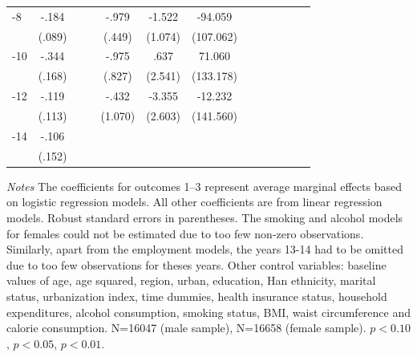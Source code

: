 \begin{table}[p]
\begin{adjustbox}{max width=\linewidth}
\begin{threeparttable}
{\begin{tabular}{l*{6}{S
S}}
-8             &    -.184\sym{**} &         &         &    -.979\sym{**} &   -1.522         &  -94.059         \\
                &   (.089)         &         &         &   (.449)         &  (1.074)         &(107.062)         \\
-10            &    -.344\sym{**} &         &         &    -.975         &     .637         &   71.060         \\
                &   (.168)         &         &         &   (.827)         &  (2.541)         &(133.178)         \\
-12           &    -.119         &         &         &    -.432         &   -3.355         &  -12.232         \\
                &   (.113)         &         &         &  (1.070)         &  (2.603)         &(141.560)         \\
-14           &    -.106         &         &         &                  &                  &                  \\
                &   (.152)         &         &         &                  &                  &                  \\
\bottomrule
\end{tabular}
\begin{tablenotes}
\item \footnotesize \textit{Notes} The coefficients for outcomes 1--3 represent average marginal effects based on logistic regression models. All other coefficients are from linear regression models.  Robust standard errors in parentheses. The smoking and alcohol models for females could not be estimated due to too few non-zero observations. Similarly, apart from the employment models, the years 13-14 had to be omitted due to too few observations for theses years.
Other control variables: baseline values of age, age squared, region, urban, education, Han ethnicity, marital status, urbanization index, time dummies, health insurance status, household expenditures, alcohol consumption, smoking status, BMI, waist circumference and calorie consumption. N=16047 (male sample), N=16658 (female sample). \sym{*} \(p<0.10\), \sym{**} \(p<0.05\), \sym{***} \(p<0.01\).
\end{tablenotes}
}
\end{threeparttable}
\end{adjustbox}
\end{table}

\clearpage

